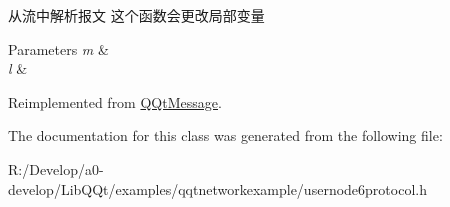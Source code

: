 从流中解析报文 这个函数会更改局部变量 


\begin{DoxyParams}{Parameters}
{\em m} & \\
\hline
{\em l} & \\
\hline
\end{DoxyParams}


Reimplemented from \mbox{\hyperlink{class_q_qt_message_a0bc25669bdd61490b1d8df6d77565f31}{Q\+Qt\+Message}}.



The documentation for this class was generated from the following file\+:\begin{DoxyCompactItemize}
\item 
R\+:/\+Develop/a0-\/develop/\+Lib\+Q\+Qt/examples/qqtnetworkexample/usernode6protocol.\+h\end{DoxyCompactItemize}
